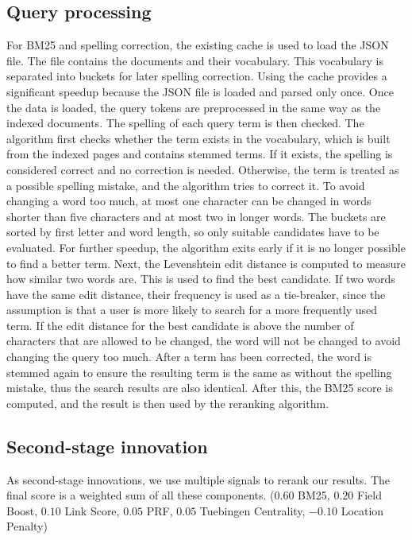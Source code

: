\documentclass[10pt,a4paper]{article}
\begin{document}
\subsection{Query processing}
For BM25 and spelling correction, the existing cache is used to load the JSON file.
The file contains the documents and their vocabulary. This vocabulary is separated into buckets for
later spelling correction. Using the cache provides a significant speedup because the JSON file is loaded and parsed only once.
Once the data is loaded, the query tokens are preprocessed in the same way as the indexed documents. The spelling
of each query term is then checked. The algorithm first checks whether the term exists in the vocabulary, which is built
from the indexed pages and contains stemmed terms. If it exists, the spelling is considered correct and
no correction is needed. Otherwise, the term is treated as a possible spelling mistake, and the
algorithm tries to correct it.
To avoid changing a word too much, at most one character can be changed in words shorter than five characters and at most two in longer words.
The buckets are sorted by first letter and word length, so only suitable candidates have to be evaluated.
For further speedup, the algorithm exits early if it is no longer possible to find a better term.
Next, the Levenshtein edit distance \cite{levenshtein1966} is computed to measure how similar two words are.
This is used to find the best candidate. If two words have the same edit distance, their frequency is used as a tie-breaker,
since the assumption is that a user is more likely to search for a more frequently used term. If the edit distance for the best candidate
is above the number of characters that are allowed to be changed, the word will not be changed to avoid changing the query too much.
After a term has been corrected, the word is stemmed again to ensure the resulting term is the same as without the spelling mistake,
thus the search results are also identical.
After this, the BM25 score is computed, and the result is then used by the reranking algorithm.

\subsection{Second-stage innovation}
As second-stage innovations, we use multiple signals to rerank our results.
The final score is a weighted sum of all these components. 
($0.60$ BM25, $0.20$ Field Boost, $0.10$ Link Score, $0.05$ PRF, $0.05$ Tuebingen Centrality, $-0.10$ Location Penalty)
\end{document}

